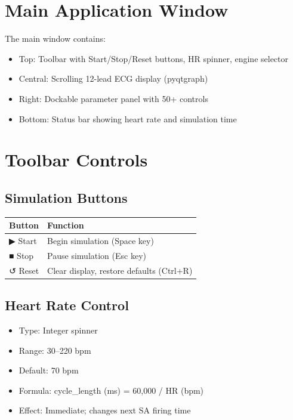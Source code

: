 \documentclass[12pt,oneside,a4paper]{book}
\begin{document}
\section{Main Application Window}

The main window contains:
\begin{itemize}
  \item Top: Toolbar with Start/Stop/Reset buttons, HR spinner, engine selector
  \item Central: Scrolling 12-lead ECG display (pyqtgraph)
  \item Right: Dockable parameter panel with 50+ controls
  \item Bottom: Status bar showing heart rate and simulation time
\end{itemize}

\section{Toolbar Controls}

\subsection{Simulation Buttons}
\begin{table}[htb]
\centering
\begin{tabularx}{\textwidth}{|l|X|}
\hline
\textbf{Button} & \textbf{Function} \\
\hline
▶ Start & Begin simulation (Space key) \\
■ Stop & Pause simulation (Esc key) \\
↺ Reset & Clear display, restore defaults (Ctrl+R) \\
\hline
\end{tabularx}
\label{tab:buttons}
\end{table}

\subsection{Heart Rate Control}
\begin{itemize}
  \item Type: Integer spinner
  \item Range: 30--220 bpm
  \item Default: 70 bpm
  \item Formula: cycle\_length (ms) = 60,000 / HR (bpm)
  \item Effect: Immediate; changes next SA firing time
\end{itemize}
\end{document}
